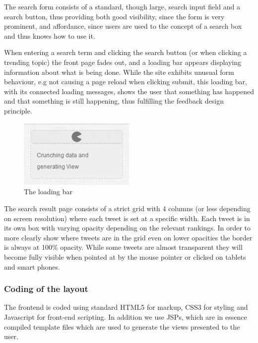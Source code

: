 The search form consists of a standard, though large, search input field and a search button, thus providing both good visibility, since the form is very prominent, and affordance, since users are used to the concept of a search box and thus knows how to use it.

When entering a search term and clicking the search button (or when clicking a trending topic) the front page fades out, and a loading bar appears displaying information about what is being done. While the site exhibits unusual form behaviour, e.g not causing a page reload when clicking submit, this loading bar, with its connected loading messages, shows the user that something has happened and that something is still happening, thus fulfilling the feedback design principle.

\begin{figure}[ht]
    \begin{minipage}[b]{1\linewidth}
        \centering
        \includegraphics[width=0.5\textwidth]{figures/feedjam_loading}
        \caption{The loading bar}
        \label{fig:FeedJamLoading}
    \end{minipage}
\end{figure}


The search result page consists of a strict grid with 4 columns (or less depending on screen resolution) where each tweet is set at a specific width. Each tweet is in its own box with varying opacity depending on the relevant rankings. In order to more clearly show where tweets are in the grid even on lower opacities the border is always at 100\% opacity. While some tweets are almost transparent they will become fully visible when pointed at by the mouse pointer or clicked on tablets and smart phones. 


\subsubsection{Coding of the layout}
The frontend is coded using standard HTML5 for markup, CSS3 for styling and Javascript for front-end scripting. In addition we use JSPs, which are in essence compiled template files which are used to generate the views presented to the user.


